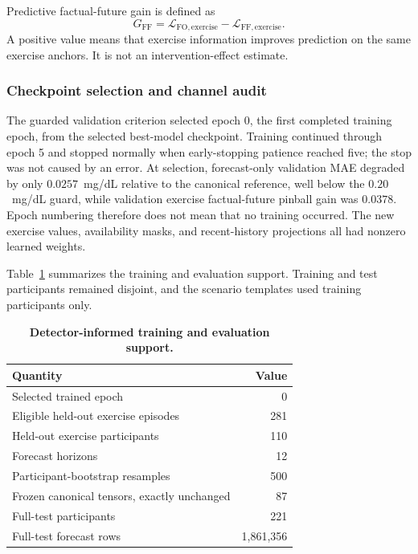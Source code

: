 Predictive factual-future gain is defined as
\begin{equation}
  G_{\mathrm{FF}}
  = \mathcal L_{\mathrm{FO,exercise}}
  - \mathcal L_{\mathrm{FF,exercise}}.
  \label{eq:exercise_ff_gain}
\end{equation}
A positive value means that exercise information improves prediction on the
same exercise anchors. It is not an intervention-effect estimate.

\subsubsection{Checkpoint selection and channel audit}

The guarded validation criterion selected epoch 0, the first completed
training epoch, from the selected best-model checkpoint. Training continued
through epoch 5 and stopped normally when early-stopping patience reached five;
the stop was not caused by an error. At selection, forecast-only validation MAE
degraded by only $0.0257$~mg/dL relative to the canonical reference, well below
the $0.20$~mg/dL guard, while validation exercise factual-future pinball gain
was $0.0378$. Epoch numbering therefore does not mean that no training occurred.
The new exercise values, availability masks, and recent-history projections
all had nonzero learned weights.

Table~\ref{tab:detector_exercise_support} summarizes the training and evaluation
support. Training and test participants remained disjoint, and the scenario
templates used training participants only.

\begin{table}[H]
  \centering
  \caption{\textbf{Detector-informed training and evaluation support.}}
  \label{tab:detector_exercise_support}
  \small
  \begin{tabular}{lr}
    \toprule
    Quantity & Value \\
    \midrule
    Selected trained epoch & 0 \\
    Eligible held-out exercise episodes & 281 \\
    Held-out exercise participants & 110 \\
    Forecast horizons & 12 \\
    Participant-bootstrap resamples & 500 \\
    Frozen canonical tensors, exactly unchanged & 87 \\
    Full-test participants & 221 \\
    Full-test forecast rows & 1{,}861{,}356 \\
    \bottomrule
  \end{tabular}
\end{table}

